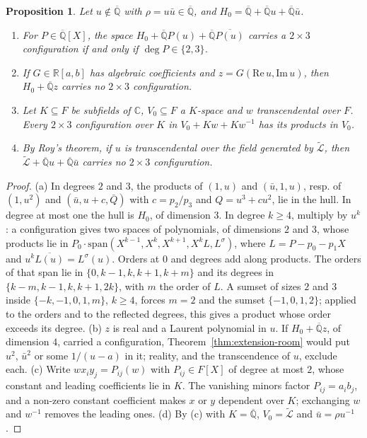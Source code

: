 \documentclass[11pt,a4paper]{article}
\theoremstyle{plain}
\newtheorem{proposition}[theorem]{Proposition}
\theoremstyle{definition}
\newcommand{\C}{\mathbb{C}}
\newcommand{\R}{\mathbb{R}}
\newcommand{\Alg}{\overline{\mathbb{Q}}}
\newcommand{\aLogs}{\widetilde{\mathcal{L}}}
\begin{document}
\begin{proposition}\label{prop:polynomial-hull}
Let $u\notin\Alg$ with $\rho=u\bar u\in\Alg$, and $H_{0}=\Alg+\Alg u+\Alg\bar u$.
\begin{enumerate}[label=\textup{(\alph*)}]
\item For $P\in\Alg[X]$, the space $H_{0}+\Alg P(u)+\Alg\overline{P(u)}$ carries a $2\times3$ configuration if and only
if $\deg P\in\{2,3\}$.
\item If $G\in\R[a,b]$ has algebraic coefficients and $z=G(\mathrm{Re}\,u,\mathrm{Im}\,u)$, then $H_{0}+\Alg z$ carries
no $2\times3$ configuration.
\item Let $K\subseteq F$ be subfields of $\C$, $V_{0}\subseteq F$ a $K$-space and $w$ transcendental over $F$. Every
$2\times3$ configuration over $K$ in $V_{0}+Kw+Kw^{-1}$ has its products in $V_{0}$.
\item By Roy's theorem, if $u$ is transcendental over the field generated by $\aLogs$, then
$\aLogs+\Alg u+\Alg\bar u$ carries no $2\times3$ configuration.
\end{enumerate}
\end{proposition}

\begin{proof}
(a) In degrees $2$ and $3$, the products of $(1,u)$ and $(\bar u,1,u)$, resp. of $(1,u^{2})$ and $(\bar u,u+c,\bar Q)$
with $c=p_{2}/p_{3}$ and $Q=u^{3}+cu^{2}$, lie in the hull. In degree at most one the hull is $H_{0}$, of dimension
$3$. In degree $k\ge4$, multiply by $u^{k}$: a configuration gives two spaces of polynomials, of dimensions $2$ and
$3$, whose products lie in $P_{0}\cdot\mathrm{span}(X^{k-1},X^{k},X^{k+1},X^{k}L,L^{\sigma})$, where $L=P-p_{0}-p_{1}X$
and $u^{k}\overline{L(u)}=L^{\sigma}(u)$. Orders at $0$ and degrees add along products. The orders of that span lie in
$\{0,k-1,k,k+1,k+m\}$ and its degrees in $\{k-m,k-1,k,k+1,2k\}$, with $m$ the order of $L$. A sumset of sizes $2$ and $3$
inside $\{-k,-1,0,1,m\}$, $k\ge4$, forces $m=2$ and the sumset $\{-1,0,1,2\}$; applied to the orders and to the
reflected degrees, this gives a product whose order exceeds its degree.
(b) $z$ is real and a Laurent polynomial in $u$. If $H_{0}+\Alg z$, of dimension $4$, carried a configuration,
Theorem~\ref{thm:extension-room} would put $u^{2}$, $\bar u^{2}$ or some $1/(u-a)$ in it; reality, and the
transcendence of $u$, exclude each.
(c) Write $wx_{i}y_{j}=P_{ij}(w)$ with $P_{ij}\in F[X]$ of degree at most $2$, whose constant and leading coefficients
lie in $K$. The vanishing minors factor $P_{ij}=a_{i}b_{j}$, and a non-zero constant coefficient makes $x$ or $y$
dependent over $K$; exchanging $w$ and $w^{-1}$ removes the leading ones.
(d) By (c) with $K=\Alg$, $V_{0}=\aLogs$ and $\bar u=\rho u^{-1}$.
\end{proof}
\end{document}
